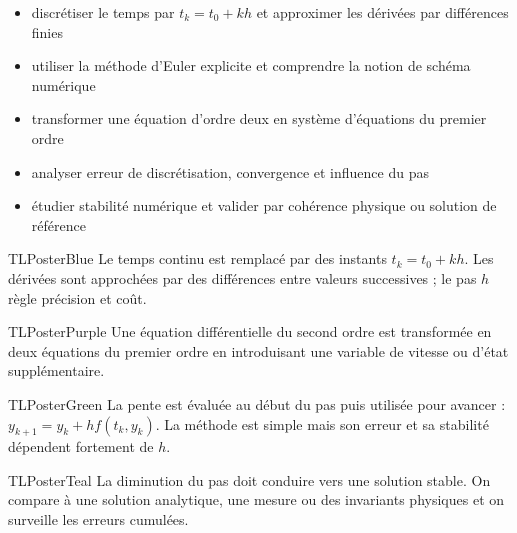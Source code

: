 \documentclass[10pt,a3paper]{article}
\begin{document}
\vspace{2mm}
\begin{minipage}[t]{0.61\linewidth}
\begin{TLPosterSavoirs}
\begin{itemize}
  \item discrétiser le temps par $t_k=t_0+kh$ et approximer les dérivées par différences finies
  \item utiliser la méthode d'Euler explicite et comprendre la notion de schéma numérique
  \item transformer une équation d'ordre deux en système d'équations du premier ordre
  \item analyser erreur de discrétisation, convergence et influence du pas
  \item étudier stabilité numérique et valider par cohérence physique ou solution de référence
\end{itemize}
\end{TLPosterSavoirs}
\end{minipage}\hfill
\begin{minipage}[t]{0.36\linewidth}
\end{minipage}
\vfill
\begin{minipage}[t]{0.49\linewidth}
\begin{TLPosterBloc}[Discrétisation]{TLPosterBlue}
Le temps continu est remplacé par des instants $t_k=t_0+kh$. Les dérivées sont approchées par des différences entre valeurs successives ; le pas $h$ règle précision et coût.
\end{TLPosterBloc}
\begin{TLPosterBloc}{TLPosterPurple}
Une équation différentielle du second ordre est transformée en deux équations du premier ordre en introduisant une variable de vitesse ou d'état supplémentaire.
\end{TLPosterBloc}
\end{minipage}\hfill
\begin{minipage}[t]{0.49\linewidth}
\begin{TLPosterBloc}{TLPosterGreen}
La pente est évaluée au début du pas puis utilisée pour avancer : $y_{k+1}=y_k+h f(t_k,y_k)$. La méthode est simple mais son erreur et sa stabilité dépendent fortement de $h$.
\end{TLPosterBloc}
\begin{TLPosterBloc}[Validation]{TLPosterTeal}
La diminution du pas doit conduire vers une solution stable. On compare à une solution analytique, une mesure ou des invariants physiques et on surveille les erreurs cumulées.
\end{TLPosterBloc}
\end{minipage}
\end{document}
